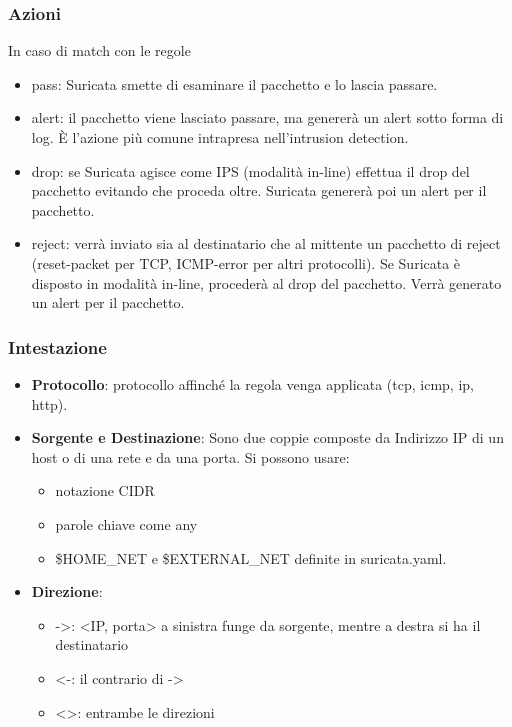 \documentclass[aspectratio=169]{beamer}
\renewcommand\texttt[1]{{\ttfamily\color{red2}#1}}
\begin{document}
    \begin{frame}
        \frametitle{Azioni}
        In caso di match con le regole
        \begin{itemize}
            \item \texttt{pass}: Suricata smette di esaminare il pacchetto e lo lascia passare.
            \item \texttt{alert}: il pacchetto viene lasciato passare, ma genererà un alert sotto forma di log. È l'azione più comune intrapresa nell'intrusion detection.
            \item \texttt{drop}: se Suricata agisce come IPS (modalità in-line)
            effettua il drop del pacchetto evitando che proceda oltre.
            Suricata genererà poi un alert per il pacchetto.
            \item \texttt{reject}: verrà inviato sia al destinatario che al mittente un pacchetto di reject (\texttt{reset-packet} per TCP, \texttt{ICMP-error} per altri protocolli). Se Suricata è disposto in modalità in-line, procederà al drop del pacchetto. Verrà generato un alert per il pacchetto.
        \end{itemize}
    \end{frame}
    
    \begin{frame}
    \frametitle{Intestazione}
    \begin{itemize}
        \item \textbf{Protocollo}: protocollo affinché la regola venga applicata (tcp, icmp, ip, http).
        \item \textbf{Sorgente e Destinazione}: Sono due coppie composte da Indirizzo IP di un host o di una rete e da una porta. Si possono usare:
        \begin{itemize}
            \item notazione CIDR
            \item parole chiave come \texttt{any}
            \item \texttt{\$HOME\_NET} e \texttt{\$EXTERNAL\_NET} definite in
            \texttt{suricata.yaml}.
        \end{itemize}
        \item \textbf{Direzione}: 
        \begin{itemize}
            \item \texttt{->}: \texttt{<IP, porta>} a sinistra funge da sorgente, mentre a destra si ha il destinatario
            \item \texttt{<-}: il contrario di \texttt{->}
            \item \texttt{<>}: entrambe le direzioni
        \end{itemize}
    \end{itemize}
    \end{frame}
    
\end{document}
